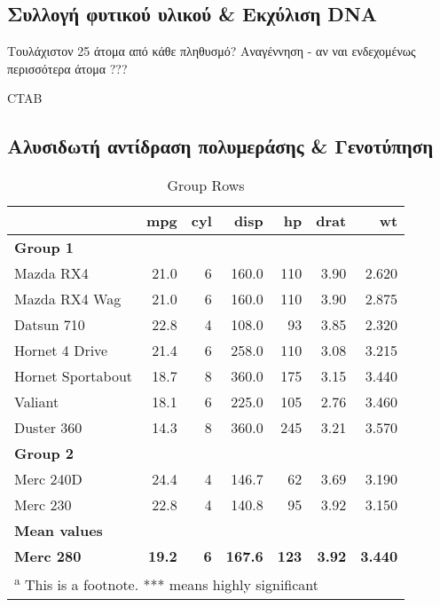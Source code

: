 \documentclass[12pt,a4paper,]{report}
\begin{document}
\hypertarget{----dna}{%
\subsection{Συλλογή φυτικού υλικού \& Εκχύλιση DNA}\label{----dna}}

Τουλάχιστον 25 άτομα από κάθε πληθυσμό? Αναγέννηση - αν ναι ενδεχομένως
περισσότερα άτομα ???

CTAB

\hypertarget{---}{%
\subsection{Αλυσιδωτή αντίδραση πολυμεράσης \& Γενοτύπηση}\label{---}}

\begin{table}

\caption{\label{tab:unnamed-chunk-1}Group Rows}
\centering
\begin{tabular}[t]{l|r|r|r|r|r|r}
\hline
  & mpg & cyl & disp & hp & drat & wt\\
\hline
\multicolumn{7}{l}{\textbf{Group 1}}\\
\hline
\hspace{1em}Mazda RX4 & 21.0 & 6 & 160.0 & 110 & 3.90 & 2.620\\
\hline
\hspace{1em}Mazda RX4 Wag & 21.0 & 6 & 160.0 & 110 & 3.90 & 2.875\\
\hline
\hspace{1em}Datsun 710 & 22.8 & 4 & 108.0 & 93 & 3.85 & 2.320\\
\hline
\hspace{1em}Hornet 4 Drive & 21.4 & 6 & 258.0 & 110 & 3.08 & 3.215\\
\hline
\hspace{1em}Hornet Sportabout & 18.7 & 8 & 360.0 & 175 & 3.15 & 3.440\\
\hline
\hspace{1em}Valiant & 18.1 & 6 & 225.0 & 105 & 2.76 & 3.460\\
\hline
\hspace{1em}Duster 360 & 14.3 & 8 & 360.0 & 245 & 3.21 & 3.570\\
\hline
\multicolumn{7}{l}{\textbf{Group 2}}\\
\hline
\hspace{1em}Merc 240D & 24.4 & 4 & 146.7 & 62 & 3.69 & 3.190\\
\hline
\hspace{1em}Merc 230 & 22.8 & 4 & 140.8 & 95 & 3.92 & 3.150\\
\hline
\multicolumn{7}{l}{\textbf{Mean values}}\\
\hline
\textbf{\hspace{1em}Merc 280} & \textbf{19.2} & \textbf{6} & \textbf{167.6} & \textbf{123} & \textbf{3.92} & \textbf{3.440}\\
\hline
\multicolumn{7}{l}{\textsuperscript{a} This is a footnote. *** means highly significant}\\
\end{tabular}
\end{table}
\end{document}
